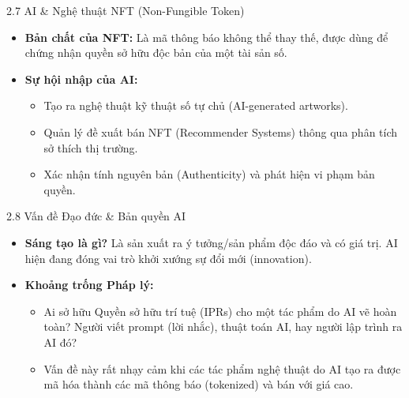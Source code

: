 \documentclass[aspectratio=169]{beamer}
\begin{document}
\begin{frame}{2.7 AI \& Nghệ thuật NFT (Non-Fungible Token)}
    \begin{itemize}
        \item \textbf{Bản chất của NFT:} Là mã thông báo không thể thay thế, được dùng để chứng nhận quyền sở hữu độc bản của một tài sản số.
        \item \textbf{Sự hội nhập của AI:}
        \begin{itemize}
            \item Tạo ra nghệ thuật kỹ thuật số tự chủ (AI-generated artworks).
            \item Quản lý đề xuất bán NFT (Recommender Systems) thông qua phân tích sở thích thị trường.
            \item Xác nhận tính nguyên bản (Authenticity) và phát hiện vi phạm bản quyền.
        \end{itemize}
    \end{itemize}
\end{frame}

\begin{frame}{2.8 Vấn đề Đạo đức \& Bản quyền AI}
    \begin{itemize}
        \item \textbf{Sáng tạo là gì?} Là sản xuất ra ý tưởng/sản phẩm độc đáo và có giá trị. AI hiện đang đóng vai trò khởi xướng sự đổi mới (innovation).
        \item \textbf{Khoảng trống Pháp lý:}
        \begin{itemize}
            \item Ai sở hữu Quyền sở hữu trí tuệ (IPRs) cho một tác phẩm do AI vẽ hoàn toàn? Người viết prompt (lời nhắc), thuật toán AI, hay người lập trình ra AI đó?
            \item Vấn đề này rất nhạy cảm khi các tác phẩm nghệ thuật do AI tạo ra được mã hóa thành các mã thông báo (tokenized) và bán với giá cao.
        \end{itemize}
    \end{itemize}
\end{frame}
\end{document}
